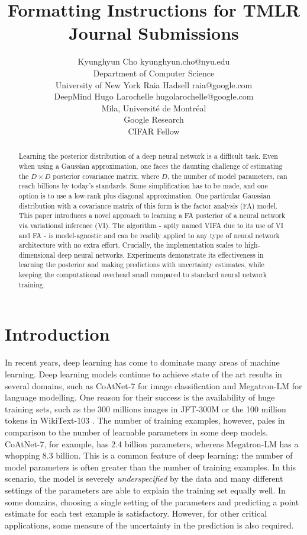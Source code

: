 \documentclass[10pt]{article} %
\title{Formatting Instructions for TMLR \\Journal Submissions}
\author{\name Kyunghyun Cho \email kyunghyun.cho@nyu.edu \\
      \addr Department of Computer Science\\
      University of New York
      \AND
      \name Raia Hadsell \email raia@google.com \\
      \addr DeepMind
      \AND
      \name Hugo Larochelle \email hugolarochelle@google.com\\
      \addr Mila, Universit\'e de Montr\'eal \\
      Google Research\\
      CIFAR Fellow}
\begin{document}
\maketitle


\begin{abstract}
Learning the posterior distribution of a deep neural network is a difficult task. Even when using a Gaussian approximation, one faces the daunting challenge of estimating the $D \times D$ posterior covariance matrix, where $D$, the number of model parameters, can reach billions by today's standards. Some simplification has to be made, and one option is to use a low-rank plus diagonal approximation. One particular Gaussian distribution with a covariance matrix of this form is the factor analysis (FA) model. This paper introduces a novel approach to learning a FA posterior of a neural network via variational inference (VI). The algorithm -  aptly named VIFA due to its use of VI and FA - is model-agnostic and can be readily applied to any type of neural network architecture with no extra effort. Crucially, the implementation scales to high-dimensional deep neural networks. Experiments demonstrate its effectiveness in learning the posterior and making predictions with uncertainty estimates, while keeping the computational overhead small compared to standard neural network training. 
\end{abstract}

\section{Introduction}

In recent years, deep learning \citep{goodfellow2016deep} has come to dominate many areas of machine learning. Deep learning models continue to achieve state of the art results in several domains, such as CoAtNet-7 \citep{dai2021} for image classification and Megatron-LM \citep{shoeybi2019} for language modelling. One reason for their success is the availability of huge training sets, such as the 300 millions images in JFT-300M \citep{sun2017} or the 100 million tokens in WikiText-103 \citep{merity2016}. The number of training examples, however, pales in comparison to the number of learnable parameters in some deep models. CoAtNet-7, for example, has 2.4 billion parameters, whereas Megatron-LM has a whopping 8.3 billion. This is a common feature of deep learning: the number of model parameters is often greater than the number of training examples. In this scenario, the model is severely \emph{underspecified} by the data and many different settings of the parameters are able to explain the training set equally well. In some domains, choosing a single setting of the parameters and predicting a point estimate for each test example is satisfactory. However, for other critical applications, some measure of the uncertainty in the prediction is also required. 
\end{document}
